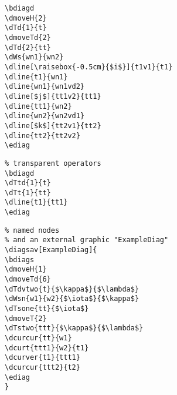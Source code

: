 \documentclass[a4paper]{article}
\begin{document}
 \begin{minipage}[b]{0.55\linewidth}\centering
  \begin{lstlisting}
\bdiagd
\dmoveH{2}
\dTd{1}{t}
\dmoveTd{2}
\dTd{2}{tt}
\dWs{wn1}{wn2}
\dline[\raisebox{-0.5cm}{$i$}]{t1v1}{t1}
\dline{t1}{wn1}
\dline{wn1}{wn1vd2}
\dline[$j$]{tt1v2}{tt1}
\dline{tt1}{wn2}
\dline{wn2}{wn2vd1}
\dline[$k$]{tt2v1}{tt2}
\dline{tt2}{tt2v2}
\ediag
\end{lstlisting}
\end{minipage}
 \begin{minipage}[b]{0.45\linewidth}\centering
\bdiagd
{}
\ediag
\end{minipage}

\begin{minipage}[b]{0.55\linewidth}\centering
 \begin{lstlisting}
% transparent operators
\bdiagd
\dTtd{1}{t}
\dTt{1}{tt}
\dline{t1}{tt1}
\ediag
\end{lstlisting}
\end{minipage}
 \begin{minipage}[b]{0.45\linewidth}\centering
\bdiagd
{}
\ediag
\end{minipage}

\begin{minipage}[b]{0.55\linewidth}\centering
 \begin{lstlisting}
% named nodes 
% and an external graphic "ExampleDiag"
\diagsav[ExampleDiag]{
\bdiags
\dmoveH{1}
\dmoveTd{6}
\dTdvtwo{t}{$\kappa$}{$\lambda$}
\dWsn{w1}{w2}{$\iota$}{$\kappa$}
\dTsone{tt}{$\iota$}
\dmoveT{2}
\dTstwo{ttt}{$\kappa$}{$\lambda$}
\dcurcur{tt}{w1}
\dcurt{ttt1}{w2}{t1}
\dcurver{t1}{ttt1}
\dcurcur{ttt2}{t2}
\ediag
}
\end{lstlisting}
\end{minipage}
 \begin{minipage}[b]{0.45\linewidth}\centering
\end{minipage}
\end{document}
